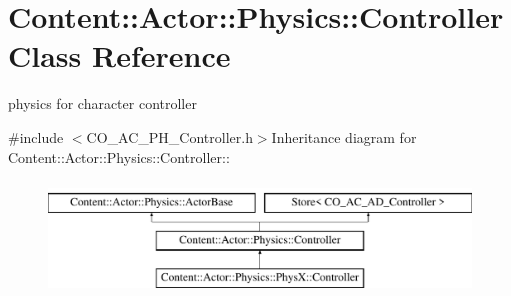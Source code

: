 \hypertarget{classContent_1_1Actor_1_1Physics_1_1Controller}{
\section{Content::Actor::Physics::Controller Class Reference}
\label{classContent_1_1Actor_1_1Physics_1_1Controller}
}


physics for character controller  


{\ttfamily \#include $<$CO\_\-AC\_\-PH\_\-Controller.h$>$}Inheritance diagram for Content::Actor::Physics::Controller::\begin{figure}[H]
\begin{center}
\leavevmode
\includegraphics[height=3cm]{classContent_1_1Actor_1_1Physics_1_1Controller}
\end{center}
\end{figure}
